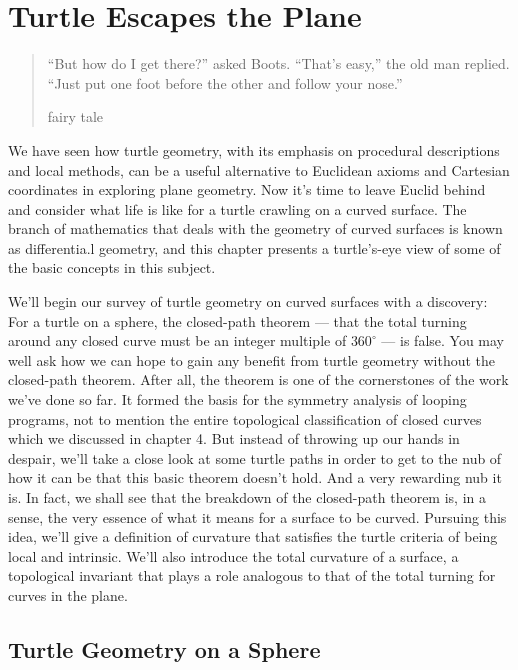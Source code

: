 \documentclass{book}
\begin{document}
\chapter{Turtle Escapes the Plane}
\begin{quote}``But how do I get there?'' asked Boots. ``That's
easy,'' the old man replied. ``Just put one foot
before the other and follow your nose.''

fairy tale
\end{quote}

We have seen how turtle geometry, with its emphasis on procedural
descriptions and local methods, can be a useful alternative to Euclidean
axioms and Cartesian coordinates in exploring plane geometry. Now
it's time to leave Euclid behind and consider what life is like for a turtle
crawling on a curved surface. The branch of mathematics that deals with
the geometry of curved surfaces is known as differentia.l geometry, and
this chapter presents a turtle's-eye view of some of the basic concepts in
this subject.

We'll begin our survey of turtle geometry on curved surfaces with a
discovery: For a turtle on a sphere, the closed-path theorem --- that the
total turning around any closed curve must be an integer multiple of
$360^{\circ}$ --- is false. You may well ask how we can hope to gain any benefit
from turtle geometry without the closed-path theorem. After all, the
theorem is one of the cornerstones of the work we've done so far. It
formed the basis for the symmetry analysis of looping programs, not to
mention the entire topological classification of closed curves which we
discussed in chapter 4. But instead of throwing up our hands in despair,
we'll take a close look at some turtle paths in order to get to the nub of
how it can be that this basic theorem doesn't hold. And a very rewarding
nub it is. In fact, we shall see that the breakdown of the closed-path
theorem is, in a sense, the very essence of what it means for a surface
to be curved. Pursuing this idea, we'll give a definition of curvature
that satisfies the turtle criteria of being local and intrinsic. We'll also
introduce the total curvature of a surface, a topological invariant that
plays a role analogous to that of the total turning for curves in the plane.

\section{Turtle Geometry on a Sphere}
\end{document}
